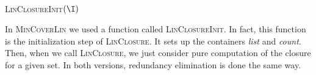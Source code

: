 \begin{minipage}[t]{0.4\textwidth}
	\begin{algorithm}[H]
		
		\BlankLine
		\BlankLine
		
		
		\BlankLine
		
	
		
		\label{alg:MinCoverClo}
	\end{algorithm}
\end{minipage}
~
\begin{minipage}[t]{0.4\textwidth}
	\begin{algorithm}[H]
		
		\BlankLine
		\BlankLine
		
		\textsc{LinClosureInit}$(\I)$ \;
		
		
		\BlankLine
		
	
		
		\label{alg:MinCoverLin}
	\end{algorithm}
\end{minipage}

\vspace{1.2em}

In \textsc{MinCoverLin} we used a function called \textsc{LinClosureInit}. In fact, this function is the initialization step of \textsc{LinClosure}. It sets up the containers \textit{list} and \textit{count}. Then, when we call \textsc{LinClosure}, we just consider pure computation of the closure for a given set. In both versions, redundancy elimination is done the same way.

\vspace{1.2em}


